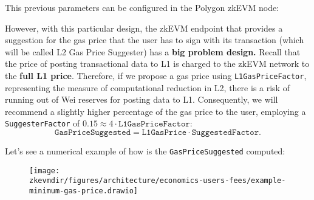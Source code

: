 This previous parameters can be configured in the Polygon zkEVM node:

%
%


However, with this particular design, the zkEVM endpoint that provides a suggestion for the gas price that the user has to sign with its transaction (which will be called L2 Gas Price Suggester) has a \textbf{big problem design.} Recall that the price of posting transactional data to L1 is charged to the zkEVM network to the \textbf{full L1 price}. Therefore, if we propose a gas price using \texttt{L1GasPriceFactor}, representing the measure of computational reduction in L2, there is a risk of running out of Wei reserves for posting data to L1.  Consequently, we will recommend a slightly higher percentage of the gas price to the user, employing a \texttt{SuggesterFactor} of $0.15 \approx 4 \cdot \texttt{L1GasPriceFactor}$:
\[
\texttt{GasPriceSuggested} = \texttt{L1GasPrice} \cdot \texttt{SuggestedFactor}.
\]

Let's see a numerical example of how is the \texttt{GasPriceSuggested} computed:
\begin{figure}[H]
\centering
\texttt{[image: \\zkevmdir/figures/architecture/economics-users-fees/example-minimum-gas-price.drawio]}
\end{figure}

